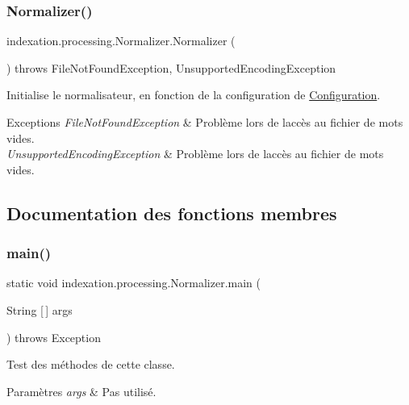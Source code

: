 \subsubsection{\texorpdfstring{Normalizer()}{Normalizer()}}
{\footnotesize\ttfamily indexation.\+processing.\+Normalizer.\+Normalizer (\begin{DoxyParamCaption}{ }\end{DoxyParamCaption}) throws File\+Not\+Found\+Exception, Unsupported\+Encoding\+Exception}

Initialise le normalisateur, en fonction de la configuration de \hyperlink{}{Configuration}.


\begin{DoxyExceptions}{Exceptions}
{\em File\+Not\+Found\+Exception} & Problème lors de l\textquotesingle{}accès au fichier de mots vides. \\
\hline
{\em Unsupported\+Encoding\+Exception} & Problème lors de l\textquotesingle{}accès au fichier de mots vides. \\
\hline
\end{DoxyExceptions}


\subsection{Documentation des fonctions membres}
\mbox{\label{classindexation_1_1processing_1_1Normalizer_a0fa449e8e4a59891a0c395d581c19307}} 
\subsubsection{\texorpdfstring{main()}{main()}}
{\footnotesize\ttfamily static void indexation.\+processing.\+Normalizer.\+main (\begin{DoxyParamCaption}\item[{String \mbox{[}$\,$\mbox{]}}]{args }\end{DoxyParamCaption}) throws Exception\hspace{0.3cm}{\ttfamily [static]}}

Test des méthodes de cette classe.


\begin{DoxyParams}{Paramètres}
{\em args} & Pas utilisé.\\
\hline
\end{DoxyParams}

